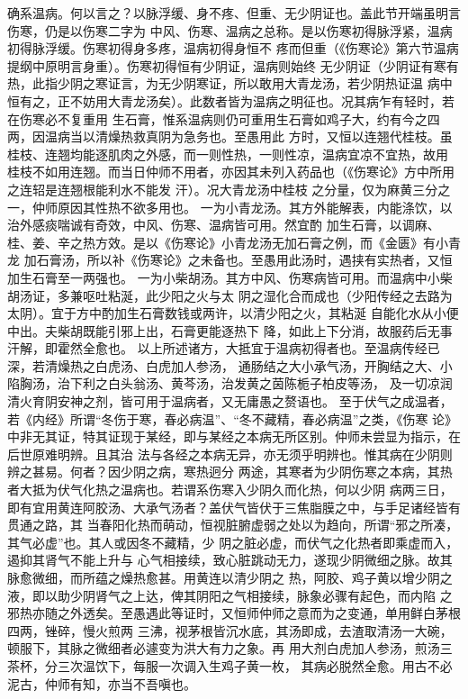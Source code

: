 \documentclass[a4paper,12pt,UTF8,twoside]{ctexbook}
\begin{document}
确系温病。何以言之？以脉浮缓、身不疼、但重、无少阴证也。盖此节开端虽明言伤寒，仍是以伤寒二字为 
中风、伤寒、温病之总称。是以伤寒初得脉浮紧，温病初得脉浮缓。伤寒初得身多疼，温病初得身恒不 
疼而但重（《伤寒论》第六节温病提纲中原明言身重）。伤寒初得恒有少阴证，温病则始终 
无少阴证（少阴证有寒有热，此指少阴之寒证言，为无少阴寒证，所以敢用大青龙汤，若少阴热证温 
病中恒有之，正不妨用大青龙汤矣）。此数者皆为温病之明征也。况其病乍有轻时，若在伤寒必不复重用 
生石膏，惟系温病则仍可重用生石膏如鸡子大，约有今之四两，因温病当以清燥热救真阴为急务也。至愚用此 
方时，又恒以连翘代桂枝。虽桂枝、连翘均能逐肌肉之外感，而一则性热，一则性凉，温病宜凉不宜热，故用 
桂枝不如用连翘。而当日仲师不用者，亦因其未列入药品也（《伤寒论》方中所用之连轺是连翘根能利水不能发 
汗）。况大青龙汤中桂枝 
之分量，仅为麻黄三分之一，仲师原因其性热不欲多用也。 
一为小青龙汤。其方外能解表，内能涤饮，以治外感痰喘诚有奇效，中风、伤寒、温病皆可用。然宜酌 
加生石膏，以调麻、桂、姜、辛之热方效。是以《伤寒论》小青龙汤无加石膏之例，而《金匮》有小青龙 
加石膏汤，所以补《伤寒论》之未备也。至愚用此汤时，遇挟有实热者，又恒加生石膏至一两强也。 
一为小柴胡汤。其方中风、伤寒病皆可用。而温病中小柴胡汤证，多兼呕吐粘涎，此少阳之火与太 
阴之湿化合而成也（少阳传经之去路为太阴）。宜于方中酌加生石膏数钱或两许，以清少阳之火，其粘涎 
自能化水从小便中出。夫柴胡既能引邪上出，石膏更能逐热下 
降，如此上下分消，故服药后无事汗解，即霍然全愈也。 
以上所述诸方，大抵宜于温病初得者也。至温病传经已深，若清燥热之白虎汤、白虎加人参汤， 
通肠结之大小承气汤，开胸结之大、小陷胸汤，治下利之白头翁汤、黄芩汤，治发黄之茵陈栀子柏皮等汤， 
及一切凉润清火育阴安神之剂，皆可用于温病者，又无庸愚之赘语也。 
至于伏气之成温者，若《内经》所谓“冬伤于寒，春必病温”、“冬不藏精，春必病温”之类，《伤寒 
论》中非无其证，特其证现于某经，即与某经之本病无所区别。仲师未尝显为指示，在后世原难明辨。且其治 
法与各经之本病无异，亦无须乎明辨也。惟其病在少阴则辨之甚易。何者？因少阴之病，寒热迥分 
两途，其寒者为少阴伤寒之本病，其热者大抵为伏气化热之温病也。若谓系伤寒入少阴久而化热，何以少阴 
病两三日，即有宜用黄连阿胶汤、大承气汤者？盖伏气皆伏于三焦脂膜之中，与手足诸经皆有贯通之路，其 
当春阳化热而萌动，恒视脏腑虚弱之处以为趋向，所谓“邪之所凑，其气必虚”也。其人或因冬不藏精，少 
阴之脏必虚，而伏气之化热者即乘虚而入，遏抑其肾气不能上升与 
心气相接续，致心脏跳动无力，遂现少阴微细之脉。故其脉愈微细，而所蕴之燥热愈甚。用黄连以清少阴之 
热，阿胶、鸡子黄以增少阴之液，即以助少阴肾气之上达，俾其阴阳之气相接续，脉象必骤有起色，而内陷 
之邪热亦随之外透矣。至愚遇此等证时，又恒师仲师之意而为之变通，单用鲜白茅根四两，锉碎，慢火煎两 
三沸，视茅根皆沉水底，其汤即成，去渣取清汤一大碗，顿服下，其脉之微细者必遽变为洪大有力之象。再 
用大剂白虎加人参汤，煎汤三茶杯，分三次温饮下，每服一次调入生鸡子黄一枚， 
其病必脱然全愈。用古不必泥古，仲师有知，亦当不吾嗔也。 
\end{document}
